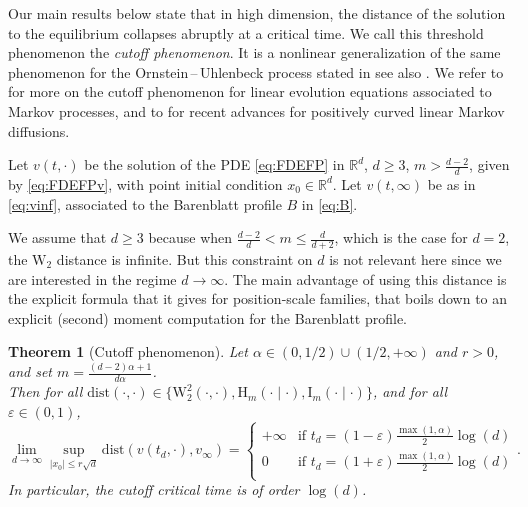 \documentclass[10pt,reqno]{amsart}
\numberwithin{equation}{section}
\newtheorem{theorem}{Theorem}[section]%
\begin{document}
Our main results below state that in high dimension, the distance of the solution to the equilibrium collapses abruptly at a critical time. We call this threshold phenomenon the \emph{cutoff phenomenon}. It is a nonlinear generalization of the same phenomenon for the Ornstein\,--\,Uhlenbeck process stated in \cite[Theorem 1.1]{MR4528974} see also \cite{MR2260742,MR2203823,MR3770869}. We refer to \cite{MR1306030,MR2375599} for more on the cutoff phenomenon for linear evolution equations associated to Markov processes, and to \cite{chafathi,Salez25,pedrotti2025transportapproachcutoffphenomenon} for recent advances for positively curved linear Markov diffusions.

Let $v(t,\cdot)$ be the solution of the PDE \eqref{eq:FDEFP} in $\mathbb{R}^d$, $d\geq3$, $m>\frac{d-2}{d}$, given by \eqref{eq:FDEFPv}, with point initial condition $x_0\in\mathbb{R}^d$. Let $v(t,\infty)$ be as in \eqref{eq:vinf}, associated to the Barenblatt profile $B$ in \eqref{eq:B}.

We assume that $d\geq3$ because when $\frac{d-2}{d}<m\leq\frac{d}{d+2}$, which is the case for $d=2$, the $\mathrm{W}_2$ distance is infinite. But this constraint on $d$ is not relevant here since we are interested in the regime $d\to\infty$. The main advantage of using this distance is the explicit formula that it gives for position-scale families, that boils down to an explicit (second) moment computation for the Barenblatt profile.

\begin{theorem}[Cutoff phenomenon]\label{th:main}
 Let $\alpha\in(0,1/2)\cup(1/2,+\infty)$ and $r > 0$, and set $m=\frac{(d-2)\alpha +1}{d\alpha}$.\\ 
 Then for all $\mathrm{dist}(\cdot,\cdot)\in\{\mathrm{W}_2^2(\cdot,\cdot),\mathrm{H}_m(\cdot\mid\cdot),\mathrm{I}_m(\cdot\mid\cdot)\}$, and for all $\varepsilon\in(0,1)$,
  \begin{equation}\label{eq:m>1:W2}
    \lim_{d\to\infty}
    \sup_{|x_0| \leq r\sqrt{d}}\mathrm{dist}(v(t_d,\cdot),v_\infty)
    =\begin{cases}
    +\infty & \text{if } t_d=(1-\varepsilon)\frac{\max(1,\alpha)}2\log(d)\\
    0 & \text{if } t_d=(1+\varepsilon)\frac{\max(1,\alpha)}2\log(d)\\
    \end{cases}.  
  \end{equation}
  In particular, the cutoff critical time is of order $\log(d)$.
\end{theorem}
\end{document}
